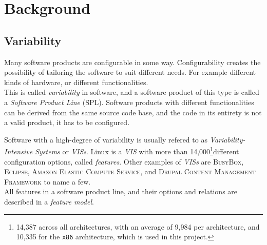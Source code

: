 \documentclass[a4paper,11pt]{report}
\newcommand{\f}{\footnote{\fn}}
\begin{document}

\newpage
        \chapter{Background}

        \section{Variability}
Many software products are configurable in some way. Configurability creates the 
possibility of tailoring the software to suit different needs. For example 
different kinds of hardware, or different functionalities. 
\\

This is called \emph{variability} in software, and a software product of 
this type is called a \emph{Software Product Line} (SPL). Software products 
with different functionalities can be derived from the same source code base, 
and the code in its entirety is not a valid product\cite[p. 1]{IntDatSPL}, it 
has to be configured.
\\

        \def \fn {14,387 across all architectures, with an average of 9,984 per 
        architecture, and 10,335 for the \texttt{x86} architecture, which is used
        in this project.}

Software with a high-degree of variability is usually refered to as 
\emph{Variability-Intensive Systems} or \emph{VISs}. Linux is a \emph{VIS} with 
more than 14,000\f different configuration options, called \emph{features}.
Other examples of \emph{VISs} are \textsc{BusyBox}, \textsc{Eclipse}, 
\textsc{Amazon Elastic Compute Service}, and \textsc{Drupal Content Management 
Framework}\cite[p. 1]{VarTesDrupal} to name a few.
\\

All features in a software product line, and their options and relations are 
described in a \emph{feature model}.
\end{document}
